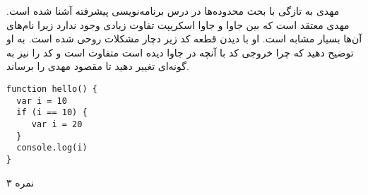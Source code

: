 
مهدی به تازگی با بحث محدوده‌ها
در درس برنامه‌نویسی پیشرفته آشنا شده است.
مهدی معتقد است که بین جاوا و جاوا اسکریپت تفاوت زیادی وجود ندارد زیرا نام‌های آن‌ها بسیار مشابه است.
او با دیدن قطعه کد زیر دچار مشکلات روحی شده است.
به او توضیح دهید که چرا خروجی کد با آنچه در جاوا دیده است متفاوت است
و کد را نیز به گونه‌ای تغییر دهید تا مقصود مهدی را برساند.

\begin{latin}
\begin{verbatim}
function hello() {
  var i = 10
  if (i == 10) {
     var i = 20
  }
  console.log(i)
}
\end{verbatim}
\end{latin}

۳ نمره
